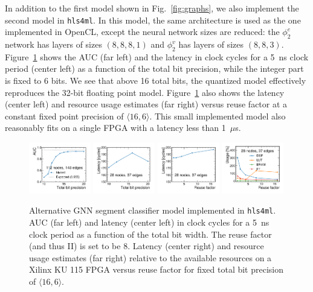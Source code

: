 \documentclass{article}
\newcommand{\hlsfml}{\texttt{hls4ml}\xspace}
\begin{document}
In addition to the first model shown in Fig.~\ref{fig:graphs}, we also implement the second model in \hlsfml.
In this model, the same architecture is used as the one implemented in OpenCL, except the neural network sizes are reduced: the $\phi_2^e$ network has layers of sizes $(8, 8, 8, 1)$ and $\phi_2^v$ has layers of sizes $(8, 8, 3)$.
Figure~\ref{fig:hlsfml_scan_v2} shows the AUC (far left) and the latency in clock cycles for a 5~ns clock period (center left) as a function of the total bit precision, while the integer part is fixed to 6 bits.
We see that above 16 total bits, the quantized model effectively reproduces the 32-bit floating point model.
Figure~\ref{fig:hlsfml_scan_v2} also shows the latency (center left) and resource usage estimates (far right) versus reuse factor at a constant fixed point precision of $\langle16,6\rangle$.
This small implemented model also reasonably fits on a single FPGA with a latency less than 1~$\mu$s.

\begin{figure}[htpb]
    \centering
    \includegraphics[width=0.24\textwidth]{figures/AUC_vs_BP_v2.pdf}
    \includegraphics[width=0.24\textwidth]{figures/Latency_vs_BP_v2.pdf}    %
    \includegraphics[width=0.24\textwidth]{figures/Latency_vs_RF_v2.pdf}
    \includegraphics[width=0.24\textwidth]{figures/Resources_vs_RF_v2.pdf}
    \caption{Alternative GNN segment classifier model implemented in \hlsfml. AUC (far left) and latency (center left) in clock cycles for a 5~ns clock period as a function of the total bit width.
    The reuse factor (and thus II) is set to be 8.
    Latency (center right) and resource usage estimates (far right) relative to the available resources on a Xilinx KU 115 FPGA versus reuse factor for fixed total bit precision of $\langle 16, 6\rangle$.}
    \label{fig:hlsfml_scan_v2}
\end{figure}




\end{document}
